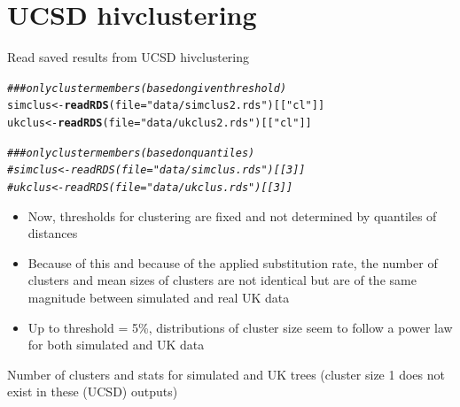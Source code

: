 \documentclass[]{revtex4}\usepackage[]{graphicx}\usepackage[]{color}
\makeatletter
\newcommand{\hlstr}[1]{\textcolor[rgb]{0.192,0.494,0.8}{#1}}%
\newcommand{\hlcom}[1]{\textcolor[rgb]{0.678,0.584,0.686}{\textit{#1}}}%
\newcommand{\hlstd}[1]{\textcolor[rgb]{0.345,0.345,0.345}{#1}}%
\newcommand{\hlkwb}[1]{\textcolor[rgb]{0.69,0.353,0.396}{#1}}%
\newcommand{\hlkwc}[1]{\textcolor[rgb]{0.333,0.667,0.333}{#1}}%
\newcommand{\hlkwd}[1]{\textcolor[rgb]{0.737,0.353,0.396}{\textbf{#1}}}%
\newenvironment{kframe}{%
 \def\at@end@of@kframe{}%
 \ifinner\ifhmode%
  \def\at@end@of@kframe{\end{minipage}}%
  \begin{minipage}{\columnwidth}%
 \fi\fi%
 \def\FrameCommand##1{\hskip\@totalleftmargin \hskip-\fboxsep
 \colorbox{shadecolor}{##1}\hskip-\fboxsep
     \hskip-\linewidth \hskip-\@totalleftmargin \hskip\columnwidth}%
 \MakeFramed {\advance\hsize-\width
   \@totalleftmargin\z@ \linewidth\hsize
   \@setminipage}}%
 {\par\unskip\endMakeFramed%
 \at@end@of@kframe}
\newenvironment{knitrout}{}{} %
\makeatother
\begin{document}
\section{UCSD hivclustering}
Read saved results from UCSD \textsf{hivclustering}
\begin{knitrout}
\color{fgcolor}\begin{kframe}
\begin{alltt}
\hlcom{### only cluster members (based on given threshold)}
\hlstd{simclus} \hlkwb{<-} \hlkwd{readRDS}\hlstd{(}\hlkwc{file} \hlstd{=} \hlstr{"data/simclus2.rds"}\hlstd{)[[}\hlstr{"cl"}\hlstd{]]}
\hlstd{ukclus} \hlkwb{<-} \hlkwd{readRDS}\hlstd{(}\hlkwc{file} \hlstd{=} \hlstr{"data/ukclus2.rds"}\hlstd{)[[}\hlstr{"cl"}\hlstd{]]}

\hlcom{### only cluster members (based on quantiles)}
\hlcom{# simclus <- readRDS(file = "data/simclus.rds")[[3]]}
\hlcom{# ukclus <- readRDS(file = "data/ukclus.rds")[[3]]}
\end{alltt}
\end{kframe}
\end{knitrout}
\begin{itemize}
\item Now, thresholds for clustering are fixed and not determined by quantiles of distances
\item Because of this and because of the applied substitution rate, the number of clusters and mean sizes of clusters are not identical but are of the same magnitude between simulated and real UK data
\item Up to threshold = 5\%, distributions of cluster size seem to follow a power law for both simulated and UK data 
\end{itemize}

Number of clusters and stats for simulated and UK trees (cluster size 1 does not exist in these (UCSD) outputs)
\end{document}
